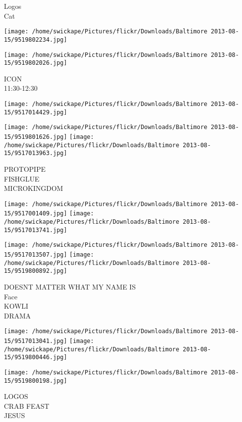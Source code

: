 \documentclass[10pt,letterpaper]{article}
\begin{document}
Logos\\
Cat
\pagebreak

\texttt{[image: /home/swickape/Pictures/flickr/Downloads/Baltimore 2013-08-15/9519802234.jpg]}

\vspace{0.25in}
\texttt{[image: /home/swickape/Pictures/flickr/Downloads/Baltimore 2013-08-15/9519802026.jpg]}

ICON\\
11:30{-}12:30
\pagebreak

\texttt{[image: /home/swickape/Pictures/flickr/Downloads/Baltimore 2013-08-15/9517014429.jpg]}

\vspace{0.25in}
\texttt{[image: /home/swickape/Pictures/flickr/Downloads/Baltimore 2013-08-15/9519801626.jpg]}
\texttt{[image: /home/swickape/Pictures/flickr/Downloads/Baltimore 2013-08-15/9517013963.jpg]}

PROTOPIPE\\
FISHGLUE\\
MICROKINGDOM
\pagebreak

\texttt{[image: /home/swickape/Pictures/flickr/Downloads/Baltimore 2013-08-15/9517001409.jpg]}
\texttt{[image: /home/swickape/Pictures/flickr/Downloads/Baltimore 2013-08-15/9517013741.jpg]}

\texttt{[image: /home/swickape/Pictures/flickr/Downloads/Baltimore 2013-08-15/9517013507.jpg]}
\texttt{[image: /home/swickape/Pictures/flickr/Downloads/Baltimore 2013-08-15/9519800892.jpg]}

DOESNT MATTER WHAT MY NAME IS\\
Face\\
KOWLI\\
DRAMA
\pagebreak

\texttt{[image: /home/swickape/Pictures/flickr/Downloads/Baltimore 2013-08-15/9517013041.jpg]}
\texttt{[image: /home/swickape/Pictures/flickr/Downloads/Baltimore 2013-08-15/9519800446.jpg]}

\vspace{0.25in}
\texttt{[image: /home/swickape/Pictures/flickr/Downloads/Baltimore 2013-08-15/9519800198.jpg]}

LOGOS\\
CRAB FEAST\\
JESUS
\pagebreak
\end{document}
